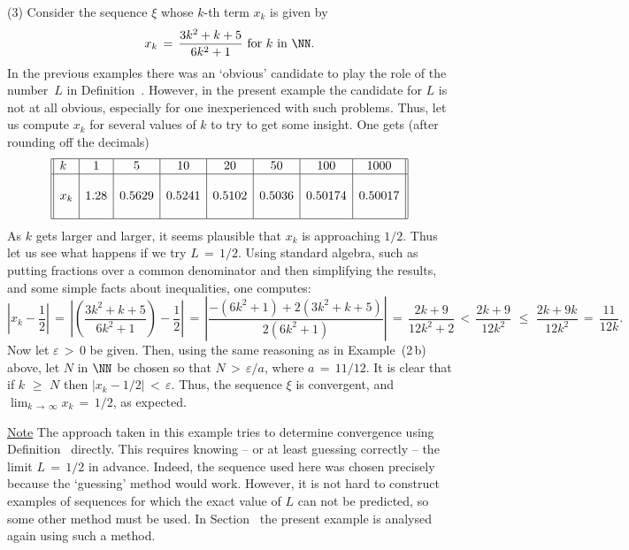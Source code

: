         (3) Consider the sequence ${\xi}$ whose $k$-th term $x_{k}$ is given by
        \begin{displaymath}
        x_{k} \,=\, \frac{3k^{2}+k+5}{6k^{2}+1} \mbox{ for $k$ in ${\NN}$}.
        \end{displaymath}
    In the previous examples there was an `obvious' candidate to play the role of the number~$L$ in Definition~.
    However, in the present example the candidate for $L$ is not at all obvious, especially for one inexperienced with such problems.
    Thus, let us compute $x_{k}$ for several values of $k$ to try to get some insight. One gets (after rounding off the decimals)
        \begin{displaymath}
        \begin{array}{||l|c|c|c|c|c|c|c||} \hline
        k & 1 & 5 & 10 & 20 & 50 & 100 & 1000 \\ \hline
          &   &   &   &    &     &     &      \\ 
        x_{k} & 1.28 & 0.5629 & 0.5241 & 0.5102 & 0.5036 & 0.50174 & 0.50017 \\
          &   &   &   &    &     &     & \\ \hline
        \end{array}
        \end{displaymath}
    As $k$ gets larger and larger, it seems plausible that $x_{k}$ is approaching $1/2$.
    Thus let us see what happens if we try $L \,=\, 1/2$.
    Using standard algebra, such as putting fractions over a common denominator and then simplifying the results, and some simple facts about inequalities, one computes:
        \begin{displaymath}
        \left|x_{k} - \frac{1}{2}\right| \,=\, \left|\left(\frac{3k^{2}+k+5}{6k^{2}+1}\right) - \frac{1}{2}\right|\,=\, \left|\frac{-(6k^{2}+1) + 2(3k^{2}+k+5)}{2(6k^{2}+1)}\right| \,=\, 
        \frac{2k+9}{12k^{2}+2}\,<\,
    \frac{2k+9}{12k^{2}}\,\,{\leq}\,\,\frac{2k+9k}{12k^{2}} \,=\, \frac{11}{12k}.
        \end{displaymath}
    Now let ${\varepsilon}\,>\,0$ be given. Then, using the same reasoning as in Example~(2\,b) above, let $N$ in ${\NN}$ be chosen so that $N\,>\,{\varepsilon}/a$, where $a \,=\, 11/12$.
    It is clear that if $k\,\,{\geq}\,\,N$ then $|x_{k}-1/2|\,<\,{\varepsilon}$.
    Thus, the sequence ${\xi}$ is convergent, and $\lim_{k \,{\rightarrow}\, {\infty}} x_{k} \,=\, 1/2$, as expected.

        \underline{Note} The approach taken in this example tries to determine convergence using Definition~ directly.
    This requires knowing -- or at least guessing correctly -- the limit $L \,=\, 1/2$ in advance.
    Indeed, the sequence used here was chosen precisely because the `guessing' method would work.
    However, it is not hard to construct examples of sequences for which the exact value of $L$ can not be predicted, so some other method must be used.
    In Section~ the present example is analysed again using such a method.

